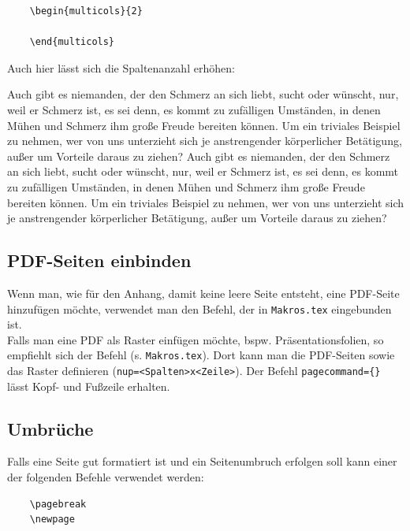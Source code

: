 \begin{verbatim}
    \begin{multicols}{2}
    	
    \end{multicols}
\end{verbatim}

Auch hier lässt sich die Spaltenanzahl erhöhen:

\begin{multicols}{3}
	Auch gibt es niemanden, der den Schmerz an sich liebt, sucht oder wünscht, nur, weil er Schmerz ist, es sei denn, es kommt zu zufälligen Umständen, in denen Mühen und Schmerz ihm große Freude bereiten können. Um ein triviales Beispiel zu nehmen, wer von uns unterzieht sich je anstrengender körperlicher Betätigung, außer um Vorteile daraus zu ziehen? Auch gibt es niemanden, der den Schmerz an sich liebt, sucht oder wünscht, nur, weil er Schmerz ist, es sei denn, es kommt zu zufälligen Umständen, in denen Mühen und Schmerz ihm große Freude bereiten können. Um ein triviales Beispiel zu nehmen, wer von uns unterzieht sich je anstrengender körperlicher Betätigung, außer um Vorteile daraus zu ziehen?
\end{multicols}


\subsection{PDF-Seiten einbinden}

Wenn man, wie für den Anhang, damit keine leere Seite entsteht, eine PDF-Seite hinzufügen möchte, verwendet man den Befehl, der in \verb|Makros.tex| eingebunden ist.\\

Falls man eine PDF als Raster einfügen möchte, bspw. Präsentationsfolien, so empfiehlt sich der Befehl \verb|| (s. \verb|Makros.tex|). Dort kann man die PDF-Seiten sowie das Raster definieren (\verb|nup=<Spalten>x<Zeile>|). Der Befehl \verb|pagecommand={}| lässt Kopf- und Fußzeile erhalten.


\subsection{Umbrüche}

Falls eine Seite gut formatiert ist und ein Seitenumbruch erfolgen soll kann einer der folgenden Befehle verwendet werden:

\begin{verbatim}
    \pagebreak
    \newpage
\end{verbatim}

